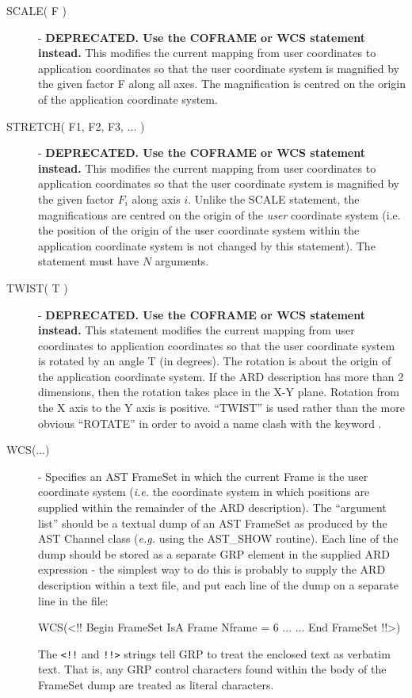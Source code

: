 \documentclass[11pt]{starlink}
\begin{document}
\begin{description}
\item [\label{ST:SCA}SCALE( F )] - \textbf{DEPRECATED. Use the COFRAME or WCS statement instead.} This modifies the current mapping from user coordinates to
application coordinates so that the user coordinate system is magnified by the
given factor F along all axes. The magnification is centred on the origin of the
application coordinate system.

\item [\label{ST:STR}STRETCH( F1, F2, F3, ... )] - \textbf{DEPRECATED. Use the COFRAME or WCS statement instead.} This modifies the current mapping from user
coordinates to application coordinates so that the user coordinate system is
magnified by the given factor $F_{i}$ along axis $i$. Unlike the SCALE
statement, the magnifications are centred on the origin of the \emph{user}
coordinate system (i.e. the position of the origin of the user coordinate
system within the application coordinate system is not changed by this
statement). The statement must have $N$ arguments.

\item [\label{ST:TWI}TWIST( T )] - \textbf{DEPRECATED. Use the COFRAME or WCS statement instead.} This statement modifies the current mapping from user
coordinates to application coordinates so that the user coordinate system is
rotated by an angle T (in degrees). The rotation is about the origin of the
application coordinate system. If the ARD description has more than 2
dimensions, then the rotation takes place in the X-Y plane. Rotation from the X
axis to the Y axis is positive. ``TWIST'' is used rather than the more obvious
``ROTATE'' in order to avoid a name clash with the keyword
.

\item [\label{ST:WCS}WCS(...)] - Specifies an AST FrameSet in which the
current Frame is the user coordinate system (\emph{i.e.} the coordinate
system in which positions are supplied within the remainder of the ARD
description). The ``argument list'' should be a textual dump of an AST
FrameSet as produced by the AST Channel class (\emph{e.g.} using the
AST\_SHOW routine). Each line of the dump should be stored as a separate
GRP element in the supplied ARD expression - the simplest way to do this
is probably to supply the ARD description within a text file, and put
each line of the dump on a separate line in the file:

\small
\begin{terminalv}
   WCS(<!!
       Begin FrameSet
       IsA Frame
       Nframe = 6
       ...
       ...
       End FrameSet
   !!>)
\end{terminalv}
\normalsize

The \verb+<!!+ and \verb+!!>+ strings tell GRP to treat the enclosed text as
verbatim text. That is, any GRP control characters found within the
body of the FrameSet dump are treated as literal characters.

\end{description}
\end{document}
